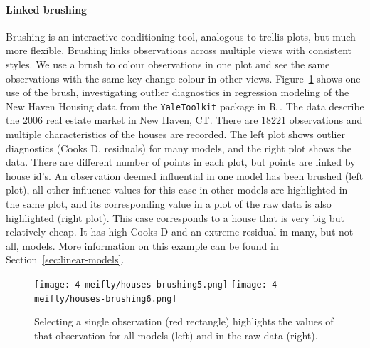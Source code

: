 \documentclass[preprint]{imsart}
\begin{document}
\paragraph{Linked brushing} Brushing is an interactive conditioning tool, analogous to trellis plots, but much more flexible. Brushing links observations across multiple views with consistent styles. We use a brush to colour observations in one plot and see the same observations with the same key change colour in other views. Figure~\ref{fig:brushing} shows one use of the brush, investigating outlier diagnostics in regression modeling of the New Haven Housing data from the {\tt YaleToolkit} package in R \citep{emerson}. The data describe the 2006 real estate market in New Haven, CT. There are 18221 observations and multiple characteristics of the houses are recorded. The left plot shows outlier diagnostics (Cooks D, residuals) for many models, and the right plot shows the data. There are different number of points in each plot, but points are linked by house id's.  An observation deemed influential in one model has been brushed (left plot), all other influence values for this case in other models are highlighted in the same plot, and its corresponding value in a plot of the raw data is also highlighted (right plot). This case corresponds to a house that is very big but relatively cheap. It has high Cooks D and an extreme residual in many, but not all, models. More information on this example can be found in Section~\ref{sec:linear-models}.

\begin{figure}[htbp]
	\centering
  \texttt{[image: 4-meifly/houses-brushing5.png]}
  \texttt{[image: 4-meifly/houses-brushing6.png]}

	\caption{Selecting a single observation (red rectangle) highlights the values of that observation for all models (left) and in the raw data (right).}
	\label{fig:brushing}
\end{figure}

\end{document}
